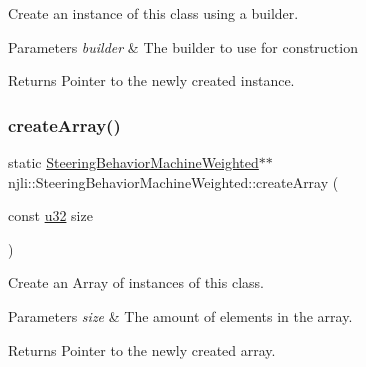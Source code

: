 Create an instance of this class using a builder.


\begin{DoxyParams}{Parameters}
{\em builder} & The builder to use for construction\\
\hline
\end{DoxyParams}
\begin{DoxyReturn}{Returns}
Pointer to the newly created instance. 
\end{DoxyReturn}
\mbox{\label{classnjli_1_1_steering_behavior_machine_weighted_af2d0b54091e028661f775b07e77b97e1}} 
\subsubsection{\texorpdfstring{create\+Array()}{createArray()}}
{\footnotesize\ttfamily static \mbox{\hyperlink{classnjli_1_1_steering_behavior_machine_weighted}{Steering\+Behavior\+Machine\+Weighted}}$\ast$$\ast$ njli\+::\+Steering\+Behavior\+Machine\+Weighted\+::create\+Array (\begin{DoxyParamCaption}\item[{const \mbox{\hyperlink{_util_8h_a10e94b422ef0c20dcdec20d31a1f5049}{u32}}}]{size }\end{DoxyParamCaption})\hspace{0.3cm}{\ttfamily [static]}}

Create an Array of instances of this class.


\begin{DoxyParams}{Parameters}
{\em size} & The amount of elements in the array.\\
\hline
\end{DoxyParams}
\begin{DoxyReturn}{Returns}
Pointer to the newly created array. 
\end{DoxyReturn}
\mbox{\label{classnjli_1_1_steering_behavior_machine_weighted_a63d165fd5d27159273375cc07efb3e7b}} 
